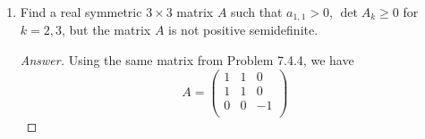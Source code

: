 \documentclass[../psets.tex]{subfiles}
\begin{document}
\begin{enumerate}[label={\textbf{4.\arabic*.}}]
\begin{proof}[Answer]
\begin{align*}
            0 &\leq \lambda_n
        \end{align*}
        Therefore, since each $\lambda_k\geq 0$, Theorem 7.4.1 implies that $A$ is positive semidefinite, as desired.
    \end{proof}
    \item Find a real symmetric $3\times 3$ matrix $A$ such that $a_{1,1}>0$, $\det A_k\geq 0$ for $k=2,3$, but the matrix $A$ is not positive semidefinite.
    \begin{proof}[Answer]
        Using the same matrix from Problem 7.4.4, we have
        \begin{equation*}
            A =
            \begin{pmatrix}
                1 & 1 & 0\\
                1 & 1 & 0\\
                0 & 0 & -1\\
            \end{pmatrix}
        \end{equation*}
    \end{proof}
\end{enumerate}
\end{document}
